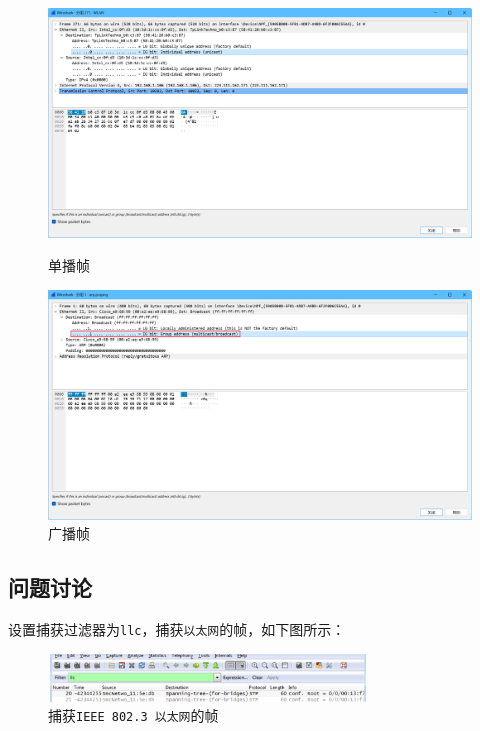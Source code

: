 \documentclass{article}
\begin{document}
\begin{enumerate}[noitemsep]
        \begin{figure}[H]
          \centering
          \begin{minipage}[b]{0.48\textwidth}
            \centering
            \includegraphics[width=\textwidth]{images/16.png}
            \caption{单播帧}
          \end{minipage}
          \hfill
          \begin{minipage}[b]{0.48\textwidth}
            \centering
            \includegraphics[width=\textwidth]{images/15.png}
            \caption{广播帧}
          \end{minipage}
        \end{figure}
\end{enumerate}

\subsection{问题讨论}

设置捕获过滤器为\texttt{llc}，捕获\texttt{以太网}的帧，如下图所示：

\begin{figure}[H]
  \centering
  \includegraphics[width=0.75\textwidth]{images/17.png}
  \caption{捕获\texttt{IEEE 802.3 以太网}的帧}
\end{figure}
\end{document}
